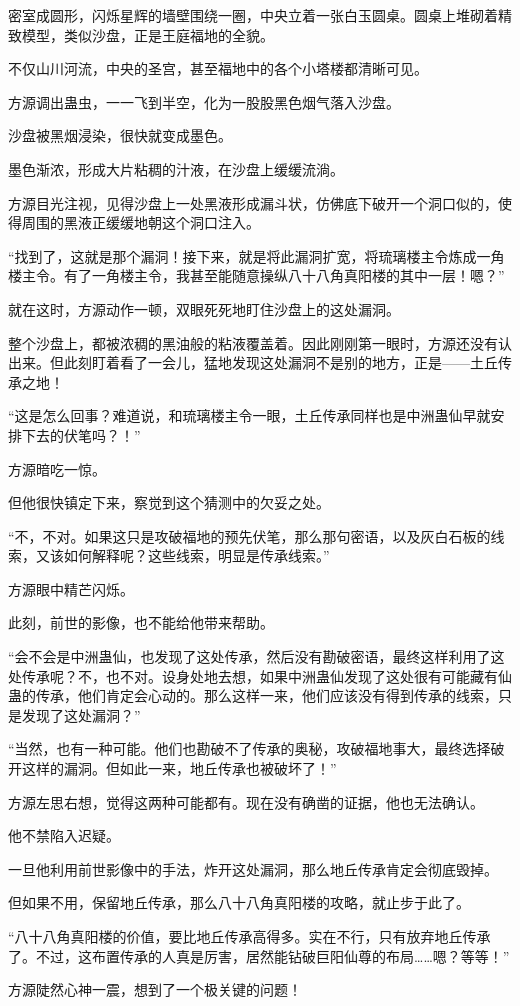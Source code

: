 \begin{this_body}
密室成圆形，闪烁星辉的墙壁围绕一圈，中央立着一张白玉圆桌。圆桌上堆砌着精致模型，类似沙盘，正是王庭福地的全貌。

不仅山川河流，中央的圣宫，甚至福地中的各个小塔楼都清晰可见。

方源调出蛊虫，一一飞到半空，化为一股股黑色烟气落入沙盘。

沙盘被黑烟浸染，很快就变成墨色。

墨色渐浓，形成大片粘稠的汁液，在沙盘上缓缓流淌。

方源目光注视，见得沙盘上一处黑液形成漏斗状，仿佛底下破开一个洞口似的，使得周围的黑液正缓缓地朝这个洞口注入。

“找到了，这就是那个漏洞！接下来，就是将此漏洞扩宽，将琉璃楼主令炼成一角楼主令。有了一角楼主令，我甚至能随意操纵八十八角真阳楼的其中一层！嗯？”

就在这时，方源动作一顿，双眼死死地盯住沙盘上的这处漏洞。

整个沙盘上，都被浓稠的黑油般的粘液覆盖着。因此刚刚第一眼时，方源还没有认出来。但此刻盯着看了一会儿，猛地发现这处漏洞不是别的地方，正是——土丘传承之地！

“这是怎么回事？难道说，和琉璃楼主令一眼，土丘传承同样也是中洲蛊仙早就安排下去的伏笔吗？！”

方源暗吃一惊。

但他很快镇定下来，察觉到这个猜测中的欠妥之处。

“不，不对。如果这只是攻破福地的预先伏笔，那么那句密语，以及灰白石板的线索，又该如何解释呢？这些线索，明显是传承线索。”

方源眼中精芒闪烁。

此刻，前世的影像，也不能给他带来帮助。

“会不会是中洲蛊仙，也发现了这处传承，然后没有勘破密语，最终这样利用了这处传承呢？不，也不对。设身处地去想，如果中洲蛊仙发现了这处很有可能藏有仙蛊的传承，他们肯定会心动的。那么这样一来，他们应该没有得到传承的线索，只是发现了这处漏洞？”

“当然，也有一种可能。他们也勘破不了传承的奥秘，攻破福地事大，最终选择破开这样的漏洞。但如此一来，地丘传承也被破坏了！”

方源左思右想，觉得这两种可能都有。现在没有确凿的证据，他也无法确认。

他不禁陷入迟疑。

一旦他利用前世影像中的手法，炸开这处漏洞，那么地丘传承肯定会彻底毁掉。

但如果不用，保留地丘传承，那么八十八角真阳楼的攻略，就止步于此了。

“八十八角真阳楼的价值，要比地丘传承高得多。实在不行，只有放弃地丘传承了。不过，这布置传承的人真是厉害，居然能钻破巨阳仙尊的布局……嗯？等等！”

方源陡然心神一震，想到了一个极关键的问题！

\end{this_body}

